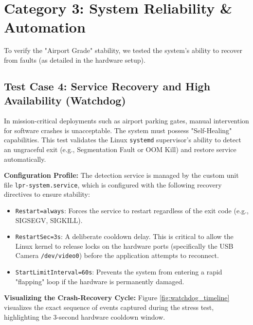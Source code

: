 \section{Category 3: System Reliability \& Automation}
To verify the "Airport Grade" stability, we tested the system's ability to recover from faults (as detailed in the hardware setup).


%
%

\subsection{Test Case 4: Service Recovery and High Availability (Watchdog)}

In mission-critical deployments such as airport parking gates, manual intervention for software crashes is unacceptable. The system must possess "Self-Healing" capabilities. This test validates the Linux \texttt{systemd} supervisor's ability to detect an ungraceful exit (e.g., Segmentation Fault or OOM Kill) and restore service automatically.

\textbf{Configuration Profile:}
The detection service is managed by the custom unit file \texttt{lpr-system.service}, which is configured with the following recovery directives to ensure stability:
\begin{itemize}
	\item \texttt{Restart=always}: Forces the service to restart regardless of the exit code (e.g., SIGSEGV, SIGKILL).
	\item \texttt{RestartSec=3s}: A deliberate cooldown delay. This is critical to allow the Linux kernel to release locks on the hardware ports (specifically the USB Camera \texttt{/dev/video0}) before the application attempts to reconnect.
	\item \texttt{StartLimitInterval=60s}: Prevents the system from entering a rapid "flapping" loop if the hardware is permanently damaged.
\end{itemize}

\textbf{Visualizing the Crash-Recovery Cycle:}
Figure \ref{fig:watchdog_timeline} visualizes the exact sequence of events captured during the stress test, highlighting the 3-second hardware cooldown window.

